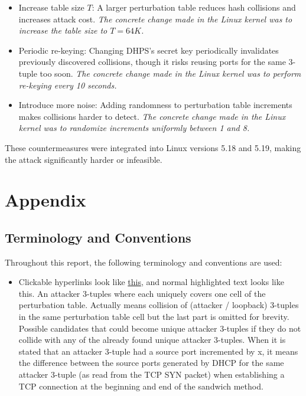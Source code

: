 \documentclass{report}
\begin{document}
\begin{itemize}
	\item \alert{Increase table size $T$:}
	A larger perturbation table reduces hash collisions and increases attack cost.
	\textit{The concrete change made in the Linux kernel was to increase the table size to $T = 64K$.}

	\item \alert{Periodic re-keying:}
	Changing DHPS’s secret key periodically invalidates previously discovered collisions, though it risks reusing ports for the same 3-tuple too soon.
	\textit{The concrete change made in the Linux kernel was to perform re-keying every 10 seconds.}

	\item \alert{Introduce more noise:}
	Adding randomness to perturbation table increments makes collisions harder to detect.
	\textit{The concrete change made in the Linux kernel was to randomize increments uniformly between 1 and 8.}
\end{itemize}

These countermeasures were integrated into Linux versions 5.18 and 5.19, making the attack significantly harder or infeasible.

\vspace{0.5cm}
\chapter{Appendix}
\label{sec:appendix}

\section{Terminology and Conventions}
\label{sec:terminology and conventions}

Throughout this report, the following terminology and conventions are used:
\begin{itemize}
	\item Clickable hyperlinks look like \hyperref[sec:terminology and conventions]{this}, and normal highlighted text looks like \alert{this}.
	 An attacker 3-tuples where each uniquely covers one cell of the perturbation table.
	 Actually means collision of (attacker / loopback) 3-tuples in the same perturbation table cell but the last part is omitted for brevity.
	 Possible candidates that could become unique attacker 3-tuples if they do not collide with any of the already found unique attacker 3-tuples.
	 When it is stated that an attacker 3-tuple had a source port incremented by x, it means the difference between the source ports generated by DHCP for the same attacker 3-tuple (as read from the TCP SYN packet) when establishing a TCP connection at the beginning and end of the sandwich method.
\end{itemize}
\end{document}
